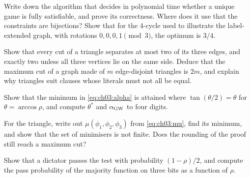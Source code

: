 \documentclass[handoutsbeamer.tex]{subfiles}
\begin{document}
\begin{frame}
\begin{exe}
Write down the algorithm that decides in polynomial time whether a unique game is fully satisfiable, and prove its correctness. Where does it use that the constraints are bijections? Show that for the 4-cycle used to illustrate the label-extended graph, with rotations $0,0,0,1 \pmod 3$, the optimum is $3/4$.
\end{exe}
\begin{exe}[Triangles]
Show that every cut of a triangle separates at most two of its three edges, and exactly two unless all three vertices lie on the same side. Deduce that the maximum cut of a graph made of $m$ edge-disjoint triangles is $2m$, and explain why triangles suit clauses whose literals must not all be equal.
\end{exe}
\end{frame}

\begin{frame}
\begin{exe}
Show that the minimum in \eqref{eq:ch03:alpha} is attained where $\tan(\theta/2) = \theta$ for $\theta = \arccos\rho$, and compute $\theta^\ast$ and $\alpha_{\rm GW}$ to four digits.
\end{exe}
\begin{exe}
For the triangle, write out $\mu(\phi_1,\phi_2,\phi_3)$ from \eqref{eq:ch03:mu}, find its minimum, and show that the set of minimisers is not finite. Does the rounding of the proof still reach a maximum cut?
\end{exe}
\begin{exe}[Dictators]
Show that a dictator passes the test with probability $(1-\rho)/2$, and compute the pass probability of the majority function on three bits as a function of $\rho$.
\end{exe}
\end{frame}

\begin{frame}[allowframebreaks]
\biblio
\end{frame}
\end{document}
